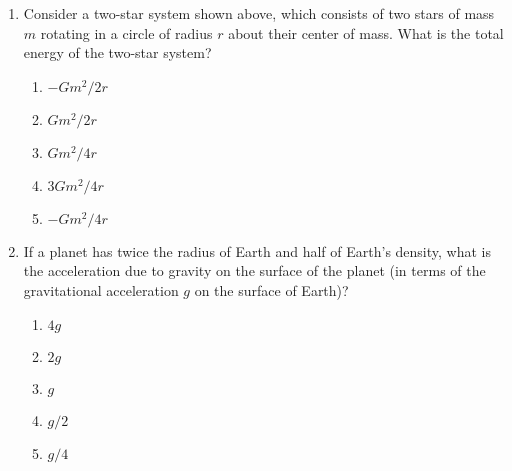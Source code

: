 \documentclass{../../../oss-apphys}
\begin{document}
\begin{multicols}{2}
\begin{enumerate}[leftmargin=18pt]
%
%    

  \item Consider a two-star system shown above, which consists of two stars of
    mass $m$ rotating in a circle of radius $r$ about their center of mass. What
    is the total energy of the two-star system?
    \begin{enumerate}[noitemsep,topsep=0pt,leftmargin=18pt,label=(\Alph*)]
    \item $-Gm^2/2r$
    \item $Gm^2/2r$
    \item $Gm^2/4r$
    \item $3Gm^2/4r$
    \item $-Gm^2/4r$
    \end{enumerate}

  \item If a planet has twice the radius of Earth and half of Earth's density,
    what is the acceleration due to gravity on the surface of the planet (in
    terms of the gravitational acceleration $g$ on the surface of Earth)?
    \begin{enumerate}[noitemsep,topsep=0pt,leftmargin=18pt,label=(\Alph*)]
    \item $4g$
    \item $2g$
    \item $g$
    \item $g/2$
    \item $g/4$
    \end{enumerate}
  \end{enumerate}
\end{multicols}
\end{document}
